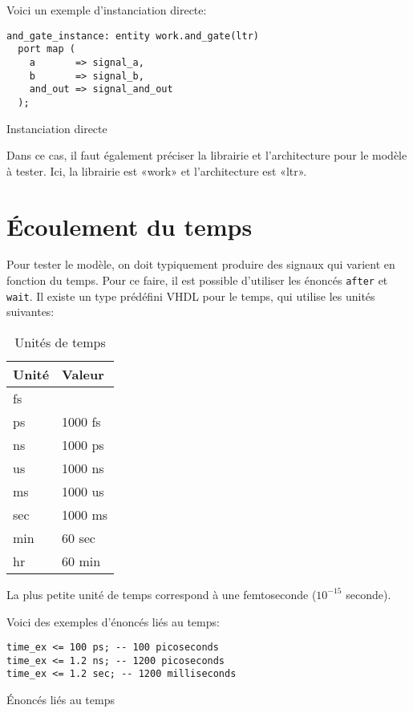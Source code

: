 \documentclass[letter, oneside]{book}
\begin{document}
Voici un exemple d'instanciation directe:

\begin{listing}[htbp]
\begin{verbatim}
and_gate_instance: entity work.and_gate(ltr)
  port map (
    a       => signal_a,
    b       => signal_b,
    and_out => signal_and_out
  );
\end{verbatim}
\caption{Instanciation directe}
\end{listing}

Dans ce cas, il faut également préciser la librairie et l'architecture
pour le modèle à tester. Ici, la librairie est «work» et
l'architecture est «ltr».

\section{Écoulement du temps}
\label{sec:org38477fb}

Pour tester le modèle, on doit typiquement produire des signaux qui
varient en fonction du temps. Pour ce faire, il est possible
d'utiliser les énoncés \texttt{after} et \texttt{wait}. Il existe un type prédéfini
VHDL pour le temps, qui utilise les unités suivantes:

\begin{table}[htbp]
\caption{\label{tab:org84414ec}Unités de temps}
\centering
\begin{tabular}{ll}
Unité & Valeur\\[0pt]
\hline
fs & \\[0pt]
ps & 1000 fs\\[0pt]
ns & 1000 ps\\[0pt]
us & 1000 ns\\[0pt]
ms & 1000 us\\[0pt]
sec & 1000 ms\\[0pt]
min & 60 sec\\[0pt]
hr & 60 min\\[0pt]
\end{tabular}
\end{table}

La plus petite unité de temps correspond à une femtoseconde (\(10^{-15}\) seconde).

Voici des exemples d'énoncés liés au temps:

\begin{listing}[htbp]
\begin{verbatim}
time_ex <= 100 ps; -- 100 picoseconds 
time_ex <= 1.2 ns; -- 1200 picoseconds
time_ex <= 1.2 sec; -- 1200 milliseconds
\end{verbatim}
\caption{Énoncés liés au temps}
\end{listing}
\end{document}
